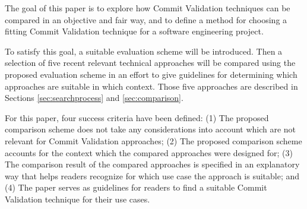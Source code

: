The goal of this paper is to explore how Commit Validation techniques can be compared in an objective and fair way, and to define a method for choosing a fitting Commit Validation technique for a software engineering project.

To satisfy this goal, a suitable evaluation scheme will be introduced.
Then a selection of five recent relevant technical approaches will be compared using the proposed evaluation scheme in an effort to give guidelines for determining which approaches are suitable in which context. Those five approaches are described in Sections \ref{sec:searchprocess} and \ref{sec:comparison}.


For this paper, four success criteria have been defined: 
(1) The proposed comparison scheme does not take any considerations into account which are not relevant for Commit Validation approaches;
(2) The proposed comparison scheme accounts for the context which the compared approaches were designed for;
(3) The comparison result of the compared approaches is specified in an explanatory way that helps readers recognize for which use case the approach is suitable; and
(4) The paper serves as guidelines for readers to find a suitable Commit Validation technique for their use cases.



